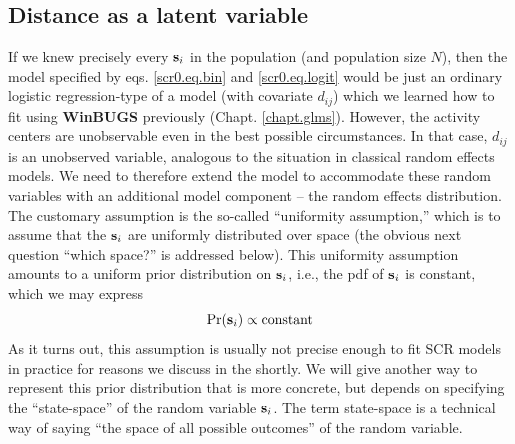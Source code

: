 \subsection{Distance as a latent variable}

If we knew precisely every ${\bf s}_{i}$ in the population (and
population size $N$), then the model specified by
eqs. \ref{scr0.eq.bin} and \ref{scr0.eq.logit} would be just an
ordinary logistic regression-type of a model (with covariate $d_{ij}$)
which we learned how to fit using {\bf WinBUGS} previously
(Chapt. \ref{chapt.glms}).  However, the activity centers are
unobservable even in the best possible circumstances. In that case,
$d_{ij}$ is an unobserved variable, analogous to the situation in
classical random effects models.  We need to therefore extend the
model to accommodate these random variables with an additional model
component -- the random effects distribution.  The customary
assumption is the so-called ``uniformity assumption,'' which is to
assume that the ${\bf s}_{i}$ are uniformly distributed over space
(the obvious next question ``which space?'' is addressed below).  This
uniformity assumption amounts to a uniform prior distribution on ${\bf
  s}_{i}$, i.e., the pdf of ${\bf s}_{i}$ is constant, which we may
express
\begin{equation}
	\Pr({\bf s}_{i}) \propto \mbox{constant}
\label{scr0.eq.sprior}
\end{equation}
 As it turns out, this assumption is usually not precise
enough to fit SCR models in practice for reasons we discuss in the
shortly.  We will give another way to represent this prior
distribution that is more concrete, but depends on specifying the
``state-space'' of the random variable ${\bf s}_{i}$. The term
state-space is a technical way of saying ``the space of all possible
outcomes'' of the random variable.

